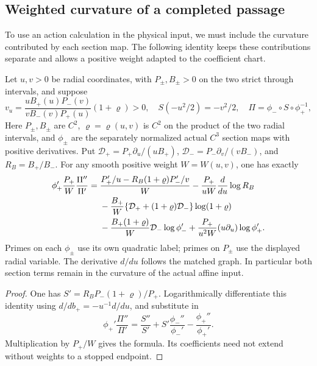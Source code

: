 \subsection{Weighted curvature of a completed passage}

To use an action calculation in the physical input, we must include the
curvature contributed by each section map. The following identity keeps
these contributions separate and allows a positive weight adapted to
the coefficient chart.

\begin{lemma}
\label{neg:lem-completed-curvature}
Let \(u,v>0\) be radial coordinates, with \(P_\pm,B_\pm>0\)
on the two strict through intervals, and suppose
\[
 v_u=\frac{uB_+(u)P_-(v)}{vB_-(v)P_+(u)}(1+\varrho)>0,
 \quad S(-u^2/2)=-v^2/2,\quad
 \Pi=\phi_-\circ S\circ\phi_+^{-1},
\]
Here \(P_\pm,B_\pm\) are \(C^2\), \(\varrho=\varrho(u,v)\)
is \(C^2\) on the product of the two radial intervals, and
\(\phi_\pm\) are the separately normalized actual \(C^3\) section
maps with positive derivatives. Put
\(\mathcal D_+=P_+\partial_u/(uB_+)\),
\(\mathcal D_-=P_-\partial_v/(vB_-)\), and \(R_B=B_+/B_-\).
For any smooth positive weight \(W=W(u,v)\), one has exactly
\begin{align}
 \phi_+'\frac{P_+}{W}\frac{\Pi''}{\Pi'}
 ={}&\frac{P_+' /u-R_B(1+\varrho)P_-'/v}{W}
 -\frac{P_+}{uW}\frac d{du}\log R_B \notag\\
 &-\frac{B_+}{W}
       \{\mathcal D_++(1+\varrho)\mathcal D_-\}\log(1+\varrho)
       \notag\\
 &-\frac{B_+(1+\varrho)}{W}\mathcal D_-\log\phi_-'
 +\frac{P_+}{u^2W}(u\partial_u)\log\phi_+'.
 \label{deg:weighted-exact-curvature-chain}
\end{align}
Primes on each \(\phi_\pm\) use its own quadratic label; primes on
\(P_\pm\) use the displayed radial variable. The derivative \(d/du\)
follows the matched graph. In particular both section terms remain in
the curvature of the actual affine input.
\end{lemma}
\begin{proof}
One has \(S'=R_BP_-(1+\varrho)/P_+\). Logarithmically differentiate
this identity using \(d/db_+=-u^{-1}d/du\), and substitute in
\[
 \phi_+'\frac{\Pi''}{\Pi'}=
 \frac{S''}{S'}+S'\frac{\phi_-''}{\phi_-'}-
                         \frac{\phi_+''}{\phi_+'}.
\]
Multiplication by \(P_+/W\) gives the formula. Its coefficients need
not extend without weights to a stopped endpoint.
\end{proof}

